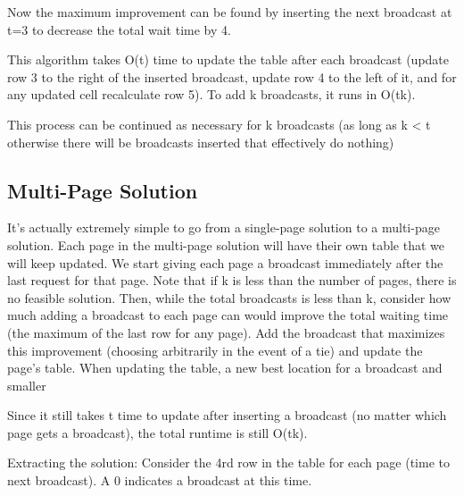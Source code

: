 \documentclass[a4paper]{article}
\begin{document}
Now the maximum improvement can be found by inserting the next broadcast at t=3 to decrease the total wait time by 4. 

This algorithm takes O(t) time to update the table after each broadcast (update row 3 to the right of the inserted broadcast, update row 4 to the left of it, and for any updated cell recalculate row 5). To add k broadcasts, it runs in O(tk).

This process can be continued as necessary for k broadcasts (as long as k < t otherwise there will be broadcasts inserted that effectively do nothing)

\subsection{Multi-Page Solution}
It's actually extremely simple to go from a single-page solution to a multi-page solution. Each page in the multi-page solution will have their own table that we will keep updated. We start giving each page a broadcast immediately after the last request for that page. Note that if k is less than the number of pages, there is no feasible solution. Then, while the total broadcasts is less than k, consider how much adding a broadcast to each page can would improve the total waiting time (the maximum of the last row for any page). Add the broadcast that maximizes this improvement (choosing arbitrarily in the event of a tie) and update the page's table. When updating the table, a new best location for a broadcast and smaller 

Since it still takes t time to update after inserting a broadcast (no matter which page gets a broadcast), the total runtime is still O(tk).

Extracting the solution: Consider the 4rd row in the table for each page (time to next broadcast). A 0 indicates a broadcast at this time.
\end{document}
